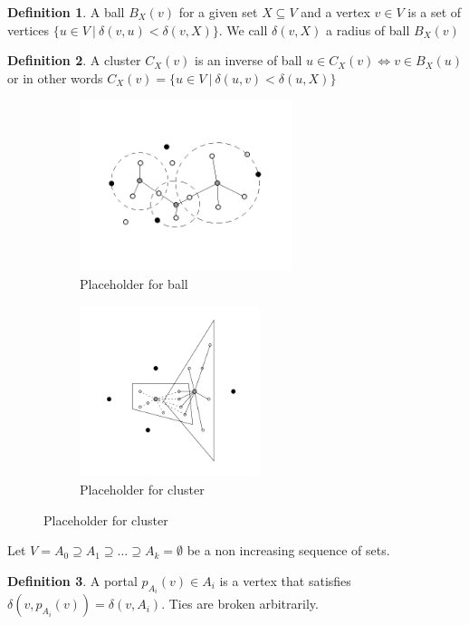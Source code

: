 \documentclass[shortabstract, lic, english]{iithesis}
\theoremstyle{definition} \newtheorem{definition}{Definition}[chapter]
\theoremstyle{remark} \newtheorem{remark}[definition]{Observation}
\theoremstyle{plain} \newtheorem{theorem}[definition]{Theorem}
\theoremstyle{plain} \newtheorem{lemma}[definition]{Lemma}
\theoremstyle{plain} \newtheorem{conjecture}[definition]{Conjecture}
\begin{document}
\begin{definition}
    A ball $B_X(v)$ for a given set $X \subseteq V$ and a vertex $v\in V$
    is a set of vertices $\{u \in V ~|~ \delta(v,u) < \delta(v, X)\}$. We call $\delta(v, X)$ a radius of ball $B_X(v)$
\end{definition}

\begin{definition}
    A cluster $C_X(v)$ is an inverse of ball 
    $u\in C_X(v) \iff v\in B_X(u)$ or in other words
    $C_X(v) = \{u \in V ~|~ \delta(u,v) < \delta(u, X)\}$
\end{definition}

\begin{figure}[h]
    \centering
    \begin{subfigure}[h]{0.495\textwidth}
        \centering
        \includegraphics[height=5cm]{images/placeholder_ball}
        \caption{Placeholder for ball}
    \end{subfigure}
    \begin{subfigure}[h]{0.495\textwidth}
        \centering
        \includegraphics[height=5cm]{images/placeholder_cluster}
        \caption{Placeholder for cluster}
    \end{subfigure}
\end{figure}

Let $V = A_0 \supseteq A_1 \supseteq \ldots \supseteq A_k = \emptyset$ be a non increasing 
sequence of sets.

\begin{definition}
    A portal $p_{A_i}(v) \in A_i$ is a vertex that satisfies $\delta(v, p_{A_i}(v)) = \delta(v, A_i)$. Ties are broken arbitrarily. 
\end{definition}
\end{document}
